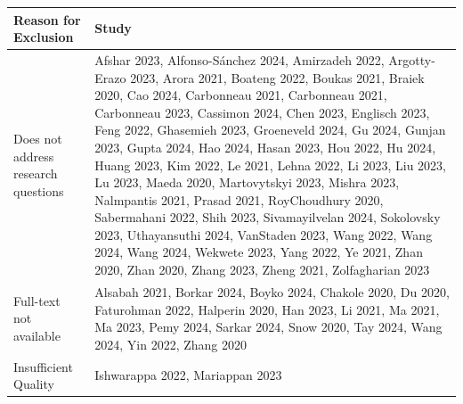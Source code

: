 \begin{tabular}{p{5cm}p{10cm}}
\toprule
Reason for Exclusion & Study \\
\midrule
Does not address research questions & Afshar 2023, Alfonso-Sánchez 2024, Amirzadeh 2022, Argotty-Erazo 2023, Arora 2021, Boateng 2022, Boukas 2021, Braiek 2020, Cao 2024, Carbonneau 2021, Carbonneau 2021, Carbonneau 2023, Cassimon 2024, Chen 2023, Englisch 2023, Feng 2022, Ghasemieh 2023, Groeneveld 2024, Gu 2024, Gunjan 2023, Gupta 2024, Hao 2024, Hasan 2023, Hou 2022, Hu 2024, Huang 2023, Kim 2022, Le 2021, Lehna 2022, Li 2023, Liu 2023, Lu 2023, Maeda 2020, Martovytskyi 2023, Mishra 2023, Nalmpantis 2021, Prasad 2021, RoyChoudhury 2020, Sabermahani 2022, Shih 2023, Sivamayilvelan 2024, Sokolovsky 2023, Uthayansuthi 2024, VanStaden 2023, Wang 2022, Wang 2024, Wang 2024, Wekwete 2023, Yang 2022, Ye 2021, Zhan 2020, Zhan 2020, Zhang 2023, Zheng 2021, Zolfagharian 2023 \\
Full-text not available & Alsabah 2021, Borkar 2024, Boyko 2024, Chakole 2020, Du 2020, Faturohman 2022, Halperin 2020, Han 2023, Li 2021, Ma 2021, Ma 2023, Pemy 2024, Sarkar 2024, Snow 2020, Tay 2024, Wang 2024, Yin 2022, Zhang 2020 \\
Insufficient Quality & Ishwarappa 2022, Mariappan 2023 \\
\bottomrule
\end{tabular}
